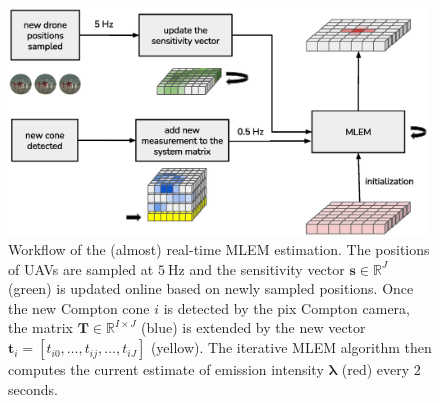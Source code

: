 \begin{figure}[htb]
  \centering
    \includegraphics[width=0.99\textwidth]{./fig/photos/workflow.eps}
  \caption{Workflow of the (almost) real-time \ac{MLEM} estimation. The positions of \ac{UAV}s are sampled at $\SI{5}{\hertz}$ and the sensitivity vector $\mathbf{s}\in\mathbb{R}^{J}$ (green) is updated online based on newly sampled positions.
  Once the new Compton cone $i$ is detected by the \ac{pix} Compton camera, 
  the matrix $\mathbf{T}\in\mathbb{R}^{I\times J}$ (blue) is extended by the new vector $\mathbf{t}_{i} = [t_{i0}, \dots,t_{ij}, \dots, t_{iJ}]$ (yellow).
  The iterative \ac{MLEM} algorithm then computes the current estimate of emission intensity $\bm{\lambda}$ (red) every $2$ seconds.
  }
    \label{fig:online_mlem}
\end{figure}%

%

